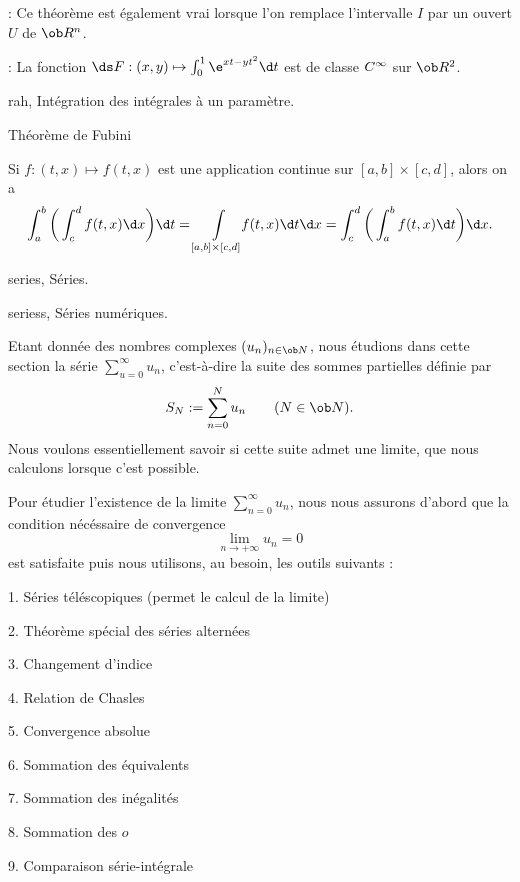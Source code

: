 \Remarque : Ce théorème est également vrai lorsque l'on remplace l'intervalle $I$ par un ouvert $U$ de $\ob R^n$. 
\bigskip

\Application : La fonction $\ds F:(x,y)\mapsto\int_0^1\e^{xt-yt^2}\d t$ est de classe $\sc C^\infty$ sur $\ob R^2$. 
\bigskip



\Subsection rah, Intégration des intégrales à un paramètre. 
\medskip


\Concept Théorème de Fubini

\Theoreme [$a<b$ et $c<d$ dans $\ob R$] 
Si $f:(t,x)\mapsto f(t,x)$ est une application continue sur $[a,b]\times[c,d]$, alors on a 
$$
\int_a^b\bigg(\int_c^df(t,x)\d x\bigg)\d t=\int\limits_{[a,b]\times[c,d]}
\!\!f(t,x)\d t\d x=\int_c^d\bigg(\int_a^bf(t,x)\d t\bigg)\d x.
$$

















%

\Chapter series, Séries. 

\Section seriess, Séries numériques. 

Etant donnée des nombres complexes $(u_n)_{n\in\ob N}$, nous étudions dans cette section la série $\sum_{u=0}^\infty u_n$, c'est-à-dire la suite des sommes partielles définie par  
$$
S_N:=\sum_{n=0}^Nu_n\qquad(N\in\ob N).
$$
Nous voulons essentiellement savoir si cette suite admet une limite, que  nous calculons lorsque c'est possible. 
\medskip

Pour étudier l'existence de la limite $\sum_{n=0}^\infty u_n$, nous nous assurons d'abord que  la condition nécéssaire de convergence   
$$
\lim_{n\to+\infty}u_n=0
$$
est satisfaite puis nous utilisons, au besoin, les outils suivants : 
\item{1.} Séries téléscopiques (permet le calcul de la limite)
\item{2.} Théorème spécial des séries alternées
\item{3.} Changement d'indice
\item{4.} Relation de Chasles
\item{5.} Convergence absolue
\item{6.} Sommation des équivalents
\item{7.} Sommation des inégalités
\item{8.} Sommation des $o$
\item{9.} Comparaison série-intégrale

